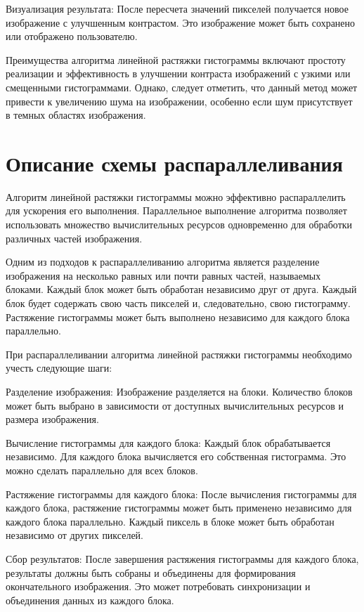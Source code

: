 \documentclass[14pt, russian]{extarticle}
\begin{document}
	Визуализация результата: После пересчета значений пикселей получается новое изображение с улучшенным контрастом. Это изображение может быть сохранено или отображено пользователю.
	
	Преимущества алгоритма линейной растяжки гистограммы включают простоту реализации и эффективность в улучшении контраста изображений с узкими или смещенными гистограммами. Однако, следует отметить, что данный метод может привести к увеличению шума на изображении, особенно если шум присутствует в темных областях изображения.
	\newpage
	
	\section{Описание схемы распараллеливания}
	Алгоритм линейной растяжки гистограммы можно эффективно распараллелить для ускорения его выполнения. Параллельное выполнение алгоритма позволяет использовать множество вычислительных ресурсов одновременно для обработки различных частей изображения.
	
	Одним из подходов к распараллеливанию алгоритма является разделение изображения на несколько равных или почти равных частей, называемых блоками. Каждый блок может быть обработан независимо друг от друга. Каждый блок будет содержать свою часть пикселей и, следовательно, свою гистограмму. Растяжение гистограммы может быть выполнено независимо для каждого блока параллельно.
	
	При распараллеливании алгоритма линейной растяжки гистограммы необходимо учесть следующие шаги:
	
	Разделение изображения: Изображение разделяется на блоки. Количество блоков может быть выбрано в зависимости от доступных вычислительных ресурсов и размера изображения.
	
	Вычисление гистограммы для каждого блока: Каждый блок обрабатывается независимо. Для каждого блока вычисляется его собственная гистограмма. Это можно сделать параллельно для всех блоков.
	
	Растяжение гистограммы для каждого блока: После вычисления гистограммы для каждого блока, растяжение гистограммы может быть применено независимо для каждого блока параллельно. Каждый пиксель в блоке может быть обработан независимо от других пикселей.
	
	Сбор результатов: После завершения растяжения гистограммы для каждого блока, результаты должны быть собраны и объединены для формирования окончательного изображения. Это может потребовать синхронизации и объединения данных из каждого блока.
	
\end{document}
